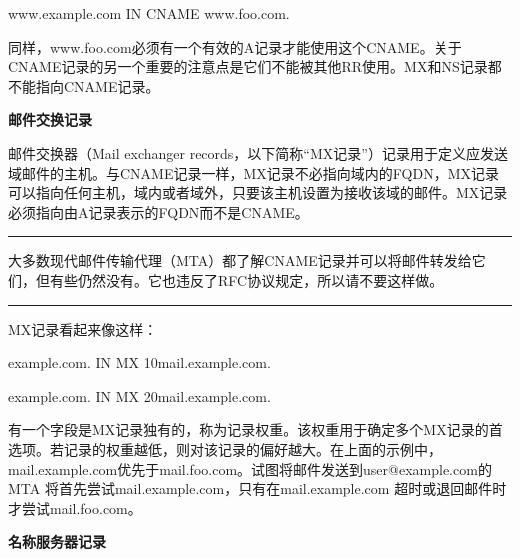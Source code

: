 ﻿\documentclass[english,runningheads,a4paper]{llncs}[2018/03/10]
\begin{document}
\par\setlength\parindent{2em}www.example.com  \qquad IN \qquad CNAME \qquad www.foo.com.

\par\setlength\parindent{2em}同样，www.foo.com必须有一个有效的A记录才能使用这个CNAME。关于CNAME记录的另一个重要的注意点是它们不能被其他RR使用。MX和NS记录都不能指向CNAME记录。

\vbox{}

\par\noindent\textbf{邮件交换记录}

\par\noindent 邮件交换器（Mail exchanger records，以下简称“MX记录”）记录用于定义应发送域邮件的主机。与CNAME记录一样，MX记录不必指向域内的FQDN，MX记录可以指向任何主机，域内或者域外，只要该主机设置为接收该域的邮件。MX记录必须指向由A记录表示的FQDN而不是CNAME。

\par\noindent\rule[0.25\baselineskip]{\textwidth}{1pt} %

\begin{adjustwidth}{2em}{2em}
\qquad 大多数现代邮件传输代理（MTA）都了解CNAME记录并可以将邮件转发给它们，但有些仍然没有。它也违反了RFC协议规定，所以请不要这样做。
\end{adjustwidth}

\par\noindent\rule[0.25\baselineskip]{\textwidth}{1pt} %

\par\setlength\parindent{2em}MX记录看起来像这样：

\par\setlength\parindent{2em}example.com.  \qquad IN \qquad MX \qquad 10mail.example.com.

\par\setlength\parindent{2em}example.com.  \qquad IN \qquad MX \qquad 20mail.example.com.

\par\setlength\parindent{2em}有一个字段是MX记录独有的，称为记录权重。该权重用于确定多个MX记录的首选项。若记录的权重越低，则对该记录的偏好越大。在上面的示例中，mail.example.com优先于mail.foo.com。试图将邮件发送到user@example.com的MTA 将首先尝试mail.example.com，只有在mail.example.com 超时或退回邮件时才尝试mail.foo.com。

\vbox{}

\par\noindent\textbf{名称服务器记录}
\end{document}
